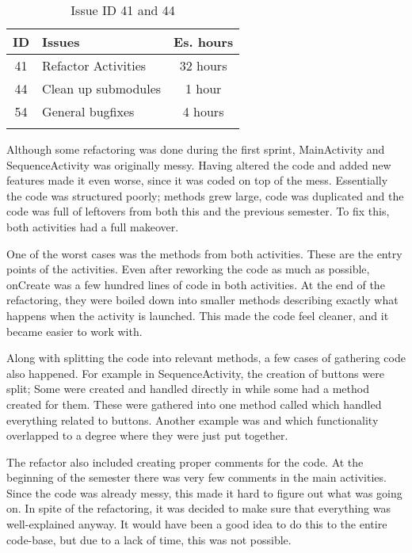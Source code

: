 \begin{longtable} { | c | p{12cm} | c | } 
\hline
	ID 	&	Issues	&		 Es. hours \\\hline
	41	&	Refactor Activities	&	32 hours	\\\hline
	44	&	Clean up submodules &	1 hour	\\\hline
	54	&	General bugfixes	&	4 hours \\\hline
\caption{Issue ID 41 and 44}
\label{tab:spr4_refactoroverview}
\end{longtable}

Although some refactoring was done during the first sprint, MainActivity and SequenceActivity was originally messy. Having altered the code and added new features made it even worse, since it was coded on top of the mess. Essentially the code was structured poorly; methods grew large, code was duplicated and the code was full of leftovers from both this and the previous semester. To fix this, both activities had a full makeover.

One of the worst cases was the  methods from both activities. These are the entry points of the activities. Even after reworking the code as much as possible, onCreate was a few hundred lines of code in both activities. At the end of the refactoring, they were boiled down into smaller methods describing exactly what happens when the activity is launched. This made the code feel cleaner, and it became easier to work with. 

Along with splitting the code into relevant methods, a few cases of gathering code also happened. For example in SequenceActivity, the creation of buttons were split; Some were created and handled directly in  while some had a method created for them. These were gathered into one method called  which handled everything related to buttons. Another example was  and  which functionality overlapped to a degree where they were just put together.

The refactor also included creating proper comments for the code. At the beginning of the semester there was very few comments in the main activities. Since the code was already messy, this made it hard to figure out what was going on. In spite of the refactoring, it was decided to make sure that everything was well-explained anyway. It would have been a good idea to do this to the entire code-base, but due to a lack of time, this was not possible.


